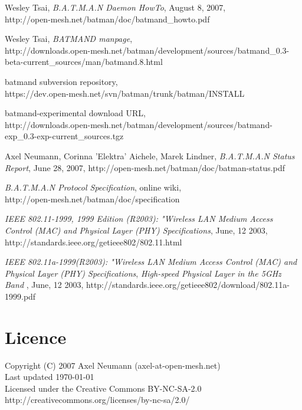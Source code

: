 \documentclass[11pt]{article}
\begin{document}
\begin{thebibliography}{1}

{Wesley Tsai},
{\it B.A.T.M.A.N Daemon HowTo}, {August 8, 2007},\\
{http://open-mesh.net/batman/doc/batmand\_howto.pdf}

{Wesley Tsai},
{\it BATMAND manpage},\\
{http://downloads.open-mesh.net/batman/development/sources/batmand\_0.3-beta-current\_sources/man/batmand.8.html}

{batmand subversion repository},\\
{https://dev.open-mesh.net/svn/batman/trunk/batman/INSTALL}

{batmand-experimental download URL},\\
{http://downloads.open-mesh.net/batman/development/sources/batmand-exp\_0.3-exp-current\_sources.tgz}


{Axel Neumann, Corinna 'Elektra' Aichele, Marek Lindner},
{\it B.A.T.M.A.N Status Report}, {June 28, 2007},
{http://open-mesh.net/batman/doc/batman-status.pdf}

{\it B.A.T.M.A.N Protocol Specification}, {online wiki},\\
{http://open-mesh.net/batman/doc/specification}


	{\it IEEE 802.11-1999, 1999 Edition (R2003): "Wireless LAN Medium
	Access Control (MAC) and Physical Layer (PHY) Specifications},
  {June, 12 2003},	
	http://standards.ieee.org/getieee802/802.11.html

	{\it IEEE 802.11a-1999(R2003): "Wireless LAN Medium Access Control (MAC) and Physical Layer (PHY) Specifications},
	{\it High-speed Physical Layer in the 5GHz Band },
  {June, 12 2003},	
	http://standards.ieee.org/getieee802/download/802.11a-1999.pdf

\end{thebibliography}

\section*{Licence}

Copyright (C) 2007 Axel Neumann (axel-at-open-mesh.net) \\
Last updated \today\\
Licensed under the Creative Commons BY-NC-SA-2.0 \\
http://creativecommons.org/licenses/by-nc-sa/2.0/
\end{document}
